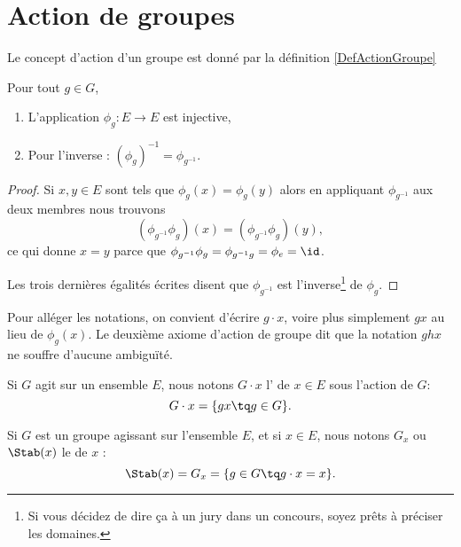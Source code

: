\section{Action de groupes}
Le concept d'action d'un groupe est donné par la définition \ref{DefActionGroupe}

\begin{lemma}
	Pour tout \( g\in G\),
	\begin{enumerate}
		\item
		      L'application \( \phi_g\colon E\to E\) est injective,
		\item
		      Pour l'inverse : \( (\phi_g)^{-1}=\phi_{g^{-1}}\).
	\end{enumerate}
\end{lemma}

\begin{proof}
	Si \( x,y\in E\) sont tels que \( \phi_g(x)=\phi_g(y)\) alors en appliquant \( \phi_{g^{-1}}\) aux deux membres nous trouvons
	\begin{equation}
		(\phi_{g^{-1}}\phi_g)(x)=(\phi_{g^{-1}}\phi_g)(y),
	\end{equation}
	ce qui donne \( x=y\) parce que \( \phi_{g^{-1}}\phi_g=\phi_{g^{-1}g}=\phi_e=\id\).

	Les trois dernières égalités écrites disent que \( \phi_{g^{-1}}\) est l'inverse\footnote{Si vous décidez de dire ça à un jury dans un concours, soyez prêts à préciser les domaines.} de \( \phi_g\).
\end{proof}

Pour alléger les notations, on convient d'écrire \( g \cdot x\), voire plus simplement \( gx\) au lieu de \( \phi_g(x) \). Le deuxième axiome d'action de groupe dit que la notation \( ghx\) ne souffre d'aucune ambiguïté.

\begin{definition}[Orbite]      \label{DEFooMZXFooXbwGjj}
	Si \( G\) agit sur un ensemble \( E\), nous notons \( G\cdot x\) l' de \( x\in E\) sous l'action de \( G\):
	\begin{equation*}
		G\cdot x = \{ gx \tq g \in G\}.
	\end{equation*}
\end{definition}

\begin{definition}[Stabilisateur]       \label{DEFooMDYGooLrOERP}
	Si \( G\) est un groupe agissant sur l'ensemble \( E\), et si \( x\in E\), nous notons \( G_x\) ou \( \Stab(x)\) le  de \( x\) :
	\begin{equation}
		\Stab(x)=G_x=\{ g\in G\tq g\cdot x=x \}.
	\end{equation}
\end{definition}


